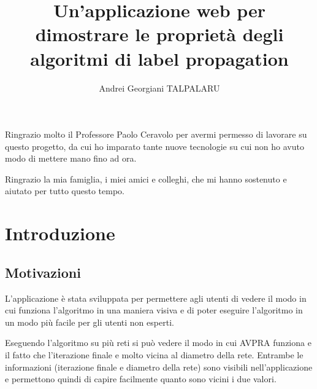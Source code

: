 \documentclass[a4paper,12pt]{report}
\begin{document}

\setcounter{secnumdepth}{5}
\setcounter{tocdepth}{5}

\title{Un'applicazione web per dimostrare le proprietà degli algoritmi di label propagation}
\author{Andrei Georgiani TALPALARU}

\beforepreface
{}
Ringrazio molto il Professore Paolo Ceravolo per avermi permesso di lavorare su questo progetto, da cui ho imparato tante nuove tecnologie su cui non ho avuto modo di mettere mano fino ad ora. 

Ringrazio la mia famiglia, i miei amici e colleghi, che mi hanno sostenuto e aiutato per tutto questo tempo.
\afterpreface
% 
% 
%		
\chapter{Introduzione}

\section{Motivazioni}
L'applicazione è stata sviluppata per permettere agli utenti di vedere il modo in cui funziona l'algoritmo in una maniera visiva e di poter eseguire l'algoritmo in un modo più facile per gli utenti non esperti.

Eseguendo l'algoritmo su più reti si può vedere il modo in cui AVPRA funziona e il fatto che l'iterazione finale e molto vicina al diametro della rete. Entrambe le informazioni (iterazione finale e diametro della rete) sono visibili nell'applicazione e permettono quindi di capire facilmente quanto sono vicini i due valori.

\pagebreak
\end{document}
